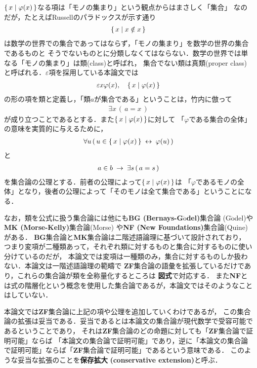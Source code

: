 	$\{\, x \mid \varphi(x)\, \}$なる項は「モノの集まり」という観点からはまさしく「集合」
	なのだが，たとえばRussellのパラドックスが示す通り
	\begin{align}
		\{\, x \mid x \notin x\, \}
	\end{align}
	は数学の世界での集合であってはならず，「モノの集まり」を数学の世界の集合であるものと
	そうでないものとに分類しなくてはならない．数学の世界では単なる「モノの集まり」は類(class)と呼ばれ，
	集合でない類は真類(proper class)と呼ばれる．$\varepsilon$項を採用している本論文では
	\begin{align}
		\varepsilon x \varphi(x),\quad \{\, x \mid \varphi(x)\, \}
	\end{align}
	の形の項を類と定義し，「類$a$が集合である」ということは，竹内\cite{TakeuchiSet}に倣って
	\begin{align}
		\exists x\, (\, a = x\, )
	\end{align}
	が成り立つことであるとする．また$\{\, x \mid \varphi(x)\, \}$に対して
	「$\varphi$である集合の全体」の意味を実質的に与えるために，
	\begin{align}
		\forall u\, (\, u \in \{\, x \mid \varphi(x)\, \} \hspace{0.25em}\leftrightarrow\hspace{0.25em} \varphi(u)\, )
	\end{align}
	と
	\begin{align}
		a \in b \hspace{0.25em}\rightarrow\hspace{0.25em} \exists s\, (\, a = s\, )
	\end{align}
	を集合論の公理とする．前者の公理によって$\{\, x \mid \varphi(x)\, \}$は
	「$\varphi$であるモノの全体」となり，後者の公理によって「そのモノは全て集合である」ということになる．
	
	なお，類を公式に扱う集合論には他にも{\bf BG (Bernays-G$\ddot{\mbox{o}}$del)}集合論
	(G$\ddot{\mbox{o}}$del\cite{Godel})や{\bf MK (Morse-Kelly)}集合論(Morse\cite{Morse})
	や{\bf NF (New Foundations)}集合論(Quine\cite{Quine})がある．
	{\bf BG}集合論と{\bf MK}集合論は二階述語論理に基づいて設計されており，
	つまり変項が二種類あって，それぞれ類に対するものと集合に対するものに使い分けているのだが，
	本論文では変項は一種類のみ，集合に対するものしか扱わない．本論文は一階述語論理の範疇で
	{\bf ZF}集合論の語彙を拡張しているだけであり，これらの集合論が類を全称量化するところは
	{\bf 図式}で対応する．
	また{\bf NF}とは式の階層化という概念を使用した集合論であるが，本論文ではそのようなことはしていない．
	
	本論文では{\bf ZF}集合論に上記の項や公理を追加していくわけであるが，
	この集合論の拡張は妥当である．妥当であるとは本論文の集合論が現代数学で受容可能であるということであり，
	それは{\bf ZF}集合論のどの命題に対しても「{\bf ZF}集合論で証明可能」ならば
	「本論文の集合論で証明可能」であり，逆に「本論文の集合論で証明可能」ならば「{\bf ZF}集合論で証明可能」であるという意味である．
	このような妥当な拡張のことを{\bf 保存拡大}
	{\bf (conservative extension)}と呼ぶ．
	
